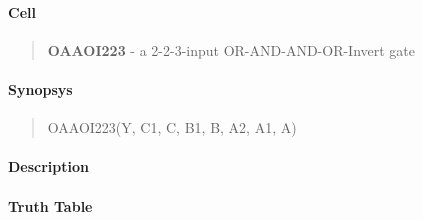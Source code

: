 \label{OAAOI223}
\paragraph{Cell}
\begin{quote}
    \textbf{OAAOI223} - a 2-2-3-input OR-AND-AND-OR-Invert gate
\end{quote}

\paragraph{Synopsys}
\begin{quote}
    OAAOI223(Y, C1, C, B1, B, A2, A1, A)
\end{quote}

\paragraph{Description}

%

\paragraph{Truth Table}
%

